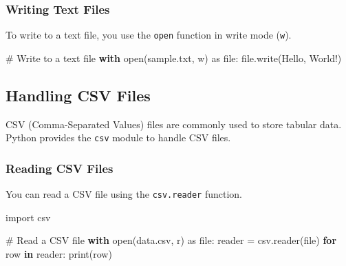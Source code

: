 \documentclass[
  letterpaper,
  DIV=11,
  numbers=noendperiod]{scrreprt}
\newenvironment{Shaded}{\begin{snugshade}}{\end{snugshade}}
\newcommand{\BuiltInTok}[1]{\textcolor[rgb]{0.00,0.23,0.31}{#1}}
\newcommand{\CommentTok}[1]{\textcolor[rgb]{0.37,0.37,0.37}{#1}}
\newcommand{\ControlFlowTok}[1]{\textcolor[rgb]{0.00,0.23,0.31}{\textbf{#1}}}
\newcommand{\ImportTok}[1]{\textcolor[rgb]{0.00,0.46,0.62}{#1}}
\newcommand{\KeywordTok}[1]{\textcolor[rgb]{0.00,0.23,0.31}{\textbf{#1}}}
\newcommand{\NormalTok}[1]{\textcolor[rgb]{0.00,0.23,0.31}{#1}}
\newcommand{\OperatorTok}[1]{\textcolor[rgb]{0.37,0.37,0.37}{#1}}
\newcommand{\StringTok}[1]{\textcolor[rgb]{0.13,0.47,0.30}{#1}}
\begin{document}
\subsubsection{Writing Text Files}\label{writing-text-files}

To write to a text file, you use the \texttt{open} function in write
mode (\texttt{\textquotesingle{}w\textquotesingle{}}).

\begin{Shaded}
\begin{Highlighting}[]
\CommentTok{\# Write to a text file}
\ControlFlowTok{with} \BuiltInTok{open}\NormalTok{(}\StringTok{\textquotesingle{}sample.txt\textquotesingle{}}\NormalTok{, }\StringTok{\textquotesingle{}w\textquotesingle{}}\NormalTok{) }\ImportTok{as} \BuiltInTok{file}\NormalTok{:}
    \BuiltInTok{file}\NormalTok{.write(}\StringTok{\textquotesingle{}Hello, World!\textquotesingle{}}\NormalTok{)}
\end{Highlighting}
\end{Shaded}

\subsection{Handling CSV Files}\label{handling-csv-files}

CSV (Comma-Separated Values) files are commonly used to store tabular
data. Python provides the \texttt{csv} module to handle CSV files.

\subsubsection{Reading CSV Files}\label{reading-csv-files}

You can read a CSV file using the \texttt{csv.reader} function.

\begin{Shaded}
\begin{Highlighting}[]
\ImportTok{import}\NormalTok{ csv}

\CommentTok{\# Read a CSV file}
\ControlFlowTok{with} \BuiltInTok{open}\NormalTok{(}\StringTok{\textquotesingle{}data.csv\textquotesingle{}}\NormalTok{, }\StringTok{\textquotesingle{}r\textquotesingle{}}\NormalTok{) }\ImportTok{as} \BuiltInTok{file}\NormalTok{:}
\NormalTok{    reader }\OperatorTok{=}\NormalTok{ csv.reader(}\BuiltInTok{file}\NormalTok{)}
    \ControlFlowTok{for}\NormalTok{ row }\KeywordTok{in}\NormalTok{ reader:}
        \BuiltInTok{print}\NormalTok{(row)}
\end{Highlighting}
\end{Shaded}
\end{document}
